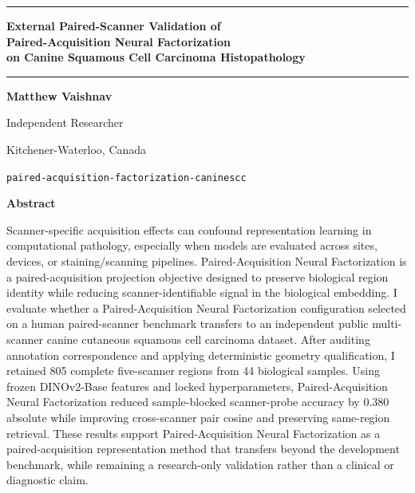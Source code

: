 \documentclass[10pt]{article}
\begin{document}
\begin{center}
\rule{\textwidth}{4pt}
\vspace{0.22in}

{\LARGE\bfseries External Paired-Scanner Validation of\\
Paired-Acquisition Neural Factorization\\
on Canine Squamous Cell Carcinoma Histopathology\par}

\vspace{0.18in}
\rule{\textwidth}{0.4pt}
\vspace{0.32in}

{\bfseries Matthew Vaishnav}\par
Independent Researcher\par
Kitchener-Waterloo, Canada\par
\texttt{paired-acquisition-factorization-caninescc}
\end{center}

\vspace{0.28in}

\begin{center}
{\bfseries Abstract}
\end{center}
\begin{center}
\begin{minipage}{0.82\textwidth}
\small
\setlength{\parindent}{0pt}
\setlength{\parskip}{0.25em}
\noindent Scanner-specific acquisition effects can confound representation learning in computational pathology, especially when models are evaluated across sites, devices, or staining/scanning pipelines. Paired-Acquisition Neural Factorization is a paired-acquisition projection objective designed to preserve biological region identity while reducing scanner-identifiable signal in the biological embedding. I evaluate whether a Paired-Acquisition Neural Factorization configuration selected on a human paired-scanner benchmark transfers to an independent public multi-scanner canine cutaneous squamous cell carcinoma dataset. After auditing annotation correspondence and applying deterministic geometry qualification, I retained 805 complete five-scanner regions from 44 biological samples. Using frozen DINOv2-Base features and locked hyperparameters, Paired-Acquisition Neural Factorization reduced sample-blocked scanner-probe accuracy by 0.380 absolute while improving cross-scanner pair cosine and preserving same-region retrieval. These results support Paired-Acquisition Neural Factorization as a paired-acquisition representation method that transfers beyond the development benchmark, while remaining a research-only validation rather than a clinical or diagnostic claim.
\end{minipage}
\end{center}
\end{document}
